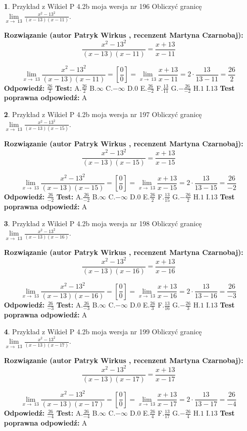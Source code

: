 \documentclass[12pt, a4paper]{article}
\theoremstyle{definition} %
\newtheorem{zad}{}
\newcommand{\zadStart}[1]{\begin{zad}#1\newline}
\newcommand{\zadStop}{\end{zad}}
\newcommand{\rozwStart}[2]{\noindent \textbf{Rozwiązanie (autor #1 , recenzent #2): }\newline}
\newcommand{\rozwStop}{\newline}
\newcommand{\odpStart}{\noindent \textbf{Odpowiedź:}\newline}
\newcommand{\odpStop}{\newline}
\newcommand{\testStart}{\noindent \textbf{Test:}\newline}
\newcommand{\testStop}{\newline}
\newcommand{\kluczStart}{\noindent \textbf{Test poprawna odpowiedź:}\newline}
\newcommand{\kluczStop}{\newline}
\begin{document}
\zadStart{Przykład z Wikieł P 4.2b moja wersja nr 196}
Obliczyć granicę $\lim\limits_{x\to\ 13}\frac{x^{2}-13^{2}}{(x-13)(x-11)}$.
\zadStop
\rozwStart{Patryk Wirkus}{Martyna Czarnobaj}
$$\frac{x^{2}-13^{2}}{(x-13)(x-11)}=\frac{x+13}{x-11}$$

$$\lim\limits_{x\to\ 13}\frac{x^{2}-13^{2}}{(x-13)(x-11)}=[\frac{0}{0}]=\lim\limits_{x\to\ 13}\frac{x+13}{x-11}=2 \cdot \frac{13}{13-11} = \frac{26}{2}$$
\rozwStop
\odpStart
$\frac{26}{2}$
\odpStop
\testStart
A.$\frac{26}{2}$
B.$\infty$
C.$-\infty$
D.$0$
E.$\frac{26}{-2}$
F.$\frac{13}{11}$
G.$-\frac{26}{-2}$
H.$1$
I.$13$
\testStop
\kluczStart
A
\kluczStop



\zadStart{Przykład z Wikieł P 4.2b moja wersja nr 197}
Obliczyć granicę $\lim\limits_{x\to\ 13}\frac{x^{2}-13^{2}}{(x-13)(x-15)}$.
\zadStop
\rozwStart{Patryk Wirkus}{Martyna Czarnobaj}
$$\frac{x^{2}-13^{2}}{(x-13)(x-15)}=\frac{x+13}{x-15}$$

$$\lim\limits_{x\to\ 13}\frac{x^{2}-13^{2}}{(x-13)(x-15)}=[\frac{0}{0}]=\lim\limits_{x\to\ 13}\frac{x+13}{x-15}=2 \cdot \frac{13}{13-15} = \frac{26}{-2}$$
\rozwStop
\odpStart
$\frac{26}{-2}$
\odpStop
\testStart
A.$\frac{26}{-2}$
B.$\infty$
C.$-\infty$
D.$0$
E.$\frac{26}{2}$
F.$\frac{13}{15}$
G.$-\frac{26}{2}$
H.$1$
I.$13$
\testStop
\kluczStart
A
\kluczStop



\zadStart{Przykład z Wikieł P 4.2b moja wersja nr 198}
Obliczyć granicę $\lim\limits_{x\to\ 13}\frac{x^{2}-13^{2}}{(x-13)(x-16)}$.
\zadStop
\rozwStart{Patryk Wirkus}{Martyna Czarnobaj}
$$\frac{x^{2}-13^{2}}{(x-13)(x-16)}=\frac{x+13}{x-16}$$

$$\lim\limits_{x\to\ 13}\frac{x^{2}-13^{2}}{(x-13)(x-16)}=[\frac{0}{0}]=\lim\limits_{x\to\ 13}\frac{x+13}{x-16}=2 \cdot \frac{13}{13-16} = \frac{26}{-3}$$
\rozwStop
\odpStart
$\frac{26}{-3}$
\odpStop
\testStart
A.$\frac{26}{-3}$
B.$\infty$
C.$-\infty$
D.$0$
E.$\frac{26}{3}$
F.$\frac{13}{16}$
G.$-\frac{26}{3}$
H.$1$
I.$13$
\testStop
\kluczStart
A
\kluczStop



\zadStart{Przykład z Wikieł P 4.2b moja wersja nr 199}
Obliczyć granicę $\lim\limits_{x\to\ 13}\frac{x^{2}-13^{2}}{(x-13)(x-17)}$.
\zadStop
\rozwStart{Patryk Wirkus}{Martyna Czarnobaj}
$$\frac{x^{2}-13^{2}}{(x-13)(x-17)}=\frac{x+13}{x-17}$$

$$\lim\limits_{x\to\ 13}\frac{x^{2}-13^{2}}{(x-13)(x-17)}=[\frac{0}{0}]=\lim\limits_{x\to\ 13}\frac{x+13}{x-17}=2 \cdot \frac{13}{13-17} = \frac{26}{-4}$$
\rozwStop
\odpStart
$\frac{26}{-4}$
\odpStop
\testStart
A.$\frac{26}{-4}$
B.$\infty$
C.$-\infty$
D.$0$
E.$\frac{26}{4}$
F.$\frac{13}{17}$
G.$-\frac{26}{4}$
H.$1$
I.$13$
\testStop
\kluczStart
A
\kluczStop
\end{document}
